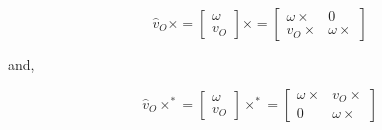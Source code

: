 	\begin{equation}
	\label{eq:cross1}
		\hat v_O \times = \begin{bmatrix}
			\omega \\ v_O
		\end{bmatrix} \times = \begin{bmatrix}
			\omega \times & 0 \\
			v_O \times & \omega \times
		\end{bmatrix}
	\end{equation}
	
	and,
	
	\begin{equation}
	\label{eq:cross2}
	\hat v_O \times^* = \begin{bmatrix}
	\omega \\ v_O
	\end{bmatrix} \times^* = \begin{bmatrix}
	\omega \times & v_O \times \\
	0 & \omega \times
	\end{bmatrix}
	\end{equation}
	
	